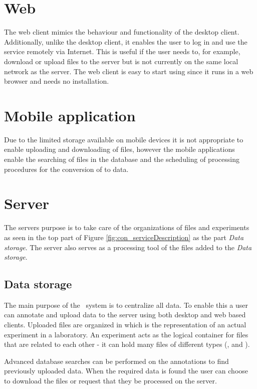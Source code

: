 \section{Web}
The web client mimics the behaviour and functionality of the desktop client. Additionally, unlike the desktop client, it enables the user to log in and use the service remotely via Internet. This is useful if the user needs to, for example, download or upload files to the server but is not currently on the same local network as the server. The web client is easy to start using since it runs in a web browser and needs no installation.


\section{Mobile application}
Due to the limited storage available on mobile devices it is not appropriate to enable uploading and downloading of files, however the mobile applications enable the searching of files in the database and the scheduling of processing procedures for the conversion of  to  data.

\section{Server}
The servers purpose is to take care of the organizations of files and experiments as seen in the top part of Figure \ref{fig:con_serviceDescription} as the part \textit{Data storage}. The server also serves as a processing tool of the files added to the \textit{Data storage}. 

\subsection{Data storage}
The main purpose of the \appName\ system is to centralize all data. To enable this a user can annotate and upload data to the server using both desktop and web based clients. Uploaded files are organized in  which is the representation of an actual experiment in a laboratory. An experiment acts as the logical container for files that are related to each other - it can hold many files of different types (,  and ).

Advanced database searches can be performed on the annotations to find previously uploaded data. When the required data is found the user can choose to download the files or request that they be processed on the server. 

